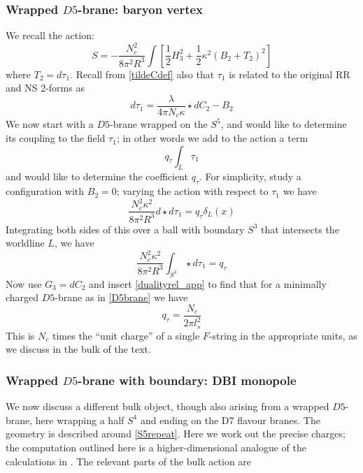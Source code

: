\documentclass[aps,preprint,nofootinbib,preprintnumbers,eqsecnum,superscriptaddress]{revtex4}
\newcommand\lam{\lambda}
\newcommand{\ka}{{\kappa}}
\begin{document}
\begin{appendix}
\subsubsection{Wrapped \texorpdfstring{$D5$}{D5}-brane: baryon vertex} 
We recall the action:
\begin{equation}
	S = - \frac{N_c^2}{8 \pi^2 R^3}\int \left[\frac{1}{2} H_3^2 + \frac{1}{2} \kappa^2 (B_2 + T_2)^2 \right]
\end{equation}
where $T_2 = d\tau_1$. Recall from \eqref{tildeCdef} also that $\tau_1$ is related to the original RR and NS 2-forms as
\begin{equation}
 d \tau_1 = \frac{\lam}{4\pi N_c \ka} \star dC_2 - B_2 \label{dualityrel_app} 
 \end{equation} 
We now start with a $D5$-brane wrapped on the $S^5$, and would like to determine its coupling to the field $\tau_1$; in other words we add to the action a term
\begin{equation}
q_{\tau} \int_{L} \tau_1
\end{equation}
and would like to determine the coefficient $q_{\tau}$. For simplicity, study a configuration with $B_2 = 0$; varying the action with respect to $\tau_1$ we have
\begin{equation}
\frac{N_c^2 \ka^2}{8 \pi^2 R^3} d \star d \tau_1 = q_{\tau} \delta_{L}(x) 
\end{equation}
Integrating both sides of this over a ball with boundary $S^3$ that intersects the worldline $L$, we have
\begin{equation}
\frac{N_c^2 \ka^2}{8 \pi^2 R^3} \int_{S^3} \star d\tau_1 = q_{\tau}
\end{equation}
Now use $G_3 = dC_2$ and insert \eqref{dualityrel_app} to find that for a minimally charged $D5$-brane as in \eqref{D5brane} we have
\begin{equation}
q_{\tau} = \frac{N_c}{2\pi l_{s}^2}
\end{equation}
This is $N_c$ times the ``unit charge'' of a single $F$-string in the appropriate units, as we discuss in the bulk of the text. 

\subsubsection{ Wrapped \texorpdfstring{$D5$}{D5}-brane with boundary: DBI monopole}
We now discuss a different bulk object, though also arising from a wrapped $D5$-brane, here wrapping a half $S^4$ and ending on the D7 flavour branes.  The geometry is described around \eqref{S5repeat}. Here we work out the precise charges; the computation outlined here is a higher-dimensional analogue of the calculations in \cite{Iqbal:2014cga}. The relevant parts of the bulk action are


\end{appendix}
\end{document}
